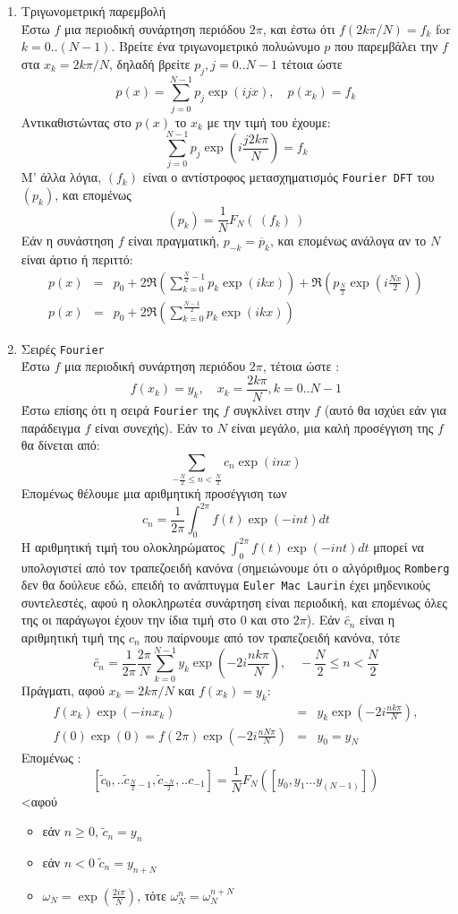 \documentclass[a4paper,11pt]{book}
\begin{document}
\begin{enumerate}
\item Τριγωνομετρική παρεμβολή\\
Έστω $f$ μια περιοδική συνάρτηση περιόδου $2\pi$, και έστω ότι $f(2k\pi/N)=f_k$ 
for $k=0..(N-1)$. Βρείτε ένα τριγωνομετρικό πολυώνυμο $p$ που παρεμβάλει την $f$ 
στα $x_k=2k\pi/N$, δηλαδή βρείτε $p_j, j=0..N-1$ τέτοια ώστε
\[  p(x)= \sum_{j=0}^{N-1} p_j \exp(ijx), \quad p(x_k)=f_k\]
Αντικαθιστώντας στο $p(x)$ το $x_k$ με την τιμή του έχουμε:
\[ \sum_{j=0}^{N-1} p_j \exp(i\frac{j2k\pi}{N}) = f_k\]
Μ' άλλα λόγια,  $(f_k)$ είναι ο αντίστροφος μετασχηματισμός {\tt\textlatin{Fourier DFT}} του $(p_k)$, και επομένως
\[ (p_k)= \frac{1}{N} F_N( \ (f_k) \ ) \]
Εάν η συνάστηση $f$ είναι πραγματική, $p_{-k}=\overline p_k$, και επομένως ανάλογα αν το $N$ είναι  άρτιο ή περιττό:
\begin{eqnarray*}
p(x)&=&p_0+
2 \Re(\sum_{k=0}^{\frac{N}{2}-1}p_k\exp(ikx))+\Re(p_{\frac{N}{2}} \exp(i\frac{Nx}{2})) \\
p(x)&=&p_0+ 2 \Re(\sum_{k=0}^{\frac{N-1}{2}}p_k\exp(ikx))
\end{eqnarray*}

\item  Σειρές {\tt\textlatin{Fourier}}\\
Έστω $f$ μια περιοδική συνάρτηση περιόδου $2\pi$, τέτοια ώστε :
\[ f(x_k)=y_k, \quad x_k=\frac{2k\pi}{N}, k=0..N-1 \]
Έστω επίσης ότι η σειρά {\tt\textlatin{Fourier}} της $f$ συγκλίνει στην $f$ (αυτό θα ισχύει εάν για παράδειγμα $f$ είναι συνεχής). Εάν το $N$ είναι μεγάλο,
μια καλή προσέγγιση της $f$ θα δίνεται από:
\[ \sum_{-\frac{N}{2} \leq n<\frac{N}{2}} c_n \exp(inx) \]
Επομένως θέλουμε μια αριθμητική προσέγγιση των 
\[ c_n=\frac{1}{2\pi} \int_0^{2\pi}f(t)\exp(-int)dt \]
Η αριθμητική τιμή του ολοκληρώματος $\int_0^{2\pi}f(t)\exp(-int)dt$ μπορεί να υπολογιστεί από τον τραπεζοειδή κανόνα (σημειώνουμε ότι ο αλγόριθμος {\tt\textlatin{Romberg}} δεν θα δούλευε εδώ, επειδή το ανάπτυγμα {\tt\textlatin{Euler Mac Laurin}}
 έχει μηδενικούς συντελεστές, αφού η ολοκληρωτέα συνάρτηση είναι περιοδική, και επομένως όλες της οι παράγωγοι έχουν την ίδια τιμή στο $0$ και στο $2\pi$).
Εάν $\tilde{c_n}$ είναι η αριθμητική τιμή της $c_n$ που παίρνουμε από 
τον τραπεζοειδή κανόνα, τότε 
\[
\tilde{c_n}=\frac{1}{2\pi}\frac{2\pi}{N}\sum_{k=0}^{N-1}y_k\exp(-2i\frac{nk\pi}{N}),
\quad  -\frac{N}{2} \leq n<\frac{N}{2} \]
Πράγματι, αφού $x_k=2k\pi/N$ και  $f(x_k)=y_k$:
\begin{eqnarray*} 
f(x_k)\exp(-inx_k)&=&y_k\exp(-2i\frac{nk\pi}{N}), \\
f(0)\exp(0)=f(2\pi)\exp(-2i\frac{nN\pi}{N})&=&y_0=y_N 
\end{eqnarray*}
Επομένως :
\[
[\tilde{c}_0,..\tilde{c}_{\frac{N}{2}-1},\tilde{c}_{\frac{-N}{2}},..c_{-1}]=
\frac{1}{N}F_N([y_0,y_1...y_{(N-1)}]) \]
<αφού
\begin{itemize}
\item εάν $n\geq0$, $\tilde{c}_n=y_n$ 
\item εάν $n<0$ $\tilde{c}_n=y_{n+N}$
\item $\omega_N=\exp(\frac{2i\pi}{N})$, 
τότε $\omega_N^n=\omega_N^{n+N}$ 
\end{itemize}


\end{enumerate}
\end{document}
